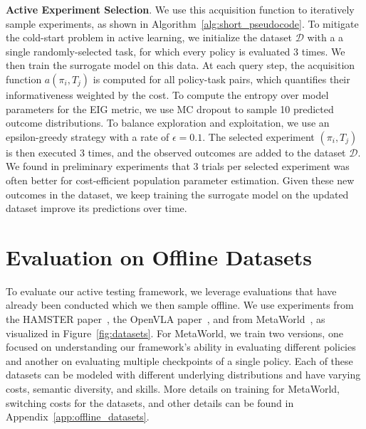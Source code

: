 


\textbf{Active Experiment Selection}.
We use this acquisition function to iteratively sample experiments, as shown in Algorithm~\ref{alg:short_pseudocode}.
To mitigate the cold-start problem in active learning, we initialize the dataset $\mathcal{D}$ with a a single randomly-selected task, for which every policy is evaluated 3 times.
We then train the surrogate model on this data.
At each query step, the acquisition function $a(\pi_i, T_j)$ is computed for all policy-task pairs, which quantifies their informativeness weighted by the cost.
To compute the entropy over model parameters for the EIG metric, we use MC dropout to sample 10 predicted outcome distributions.
To balance exploration and exploitation, we use an epsilon-greedy strategy with a rate of $\epsilon=0.1$.
The selected experiment $(\pi_i, T_j)$ is then executed 3 times, and the observed outcomes are added to the dataset $\mathcal{D}$.
We found in preliminary experiments that 3 trials per selected experiment was often better for cost-efficient population parameter estimation.
Given these new outcomes in the dataset, we keep training the surrogate model on the updated dataset improve its predictions over time.

\section{Evaluation on Offline Datasets}



To evaluate our active testing framework, we leverage evaluations that have already been conducted which we then sample offline.
We use experiments from the HAMSTER paper~\cite{li2025hamster}, the  OpenVLA paper~\cite{kim24openvla}, and from MetaWorld~\cite{yu2020meta}, as visualized in Figure~\ref{fig:datasets}.
For MetaWorld, we train two versions, one focused on understanding our framework's ability in evaluating different policies and another on evaluating multiple checkpoints of a single policy.
Each of these datasets can be modeled with different underlying distributions and have varying costs, semantic diversity, and skills.
More details on training for MetaWorld, switching costs for the datasets, and other details can be found in Appendix~\ref{app:offline_datasets}.

